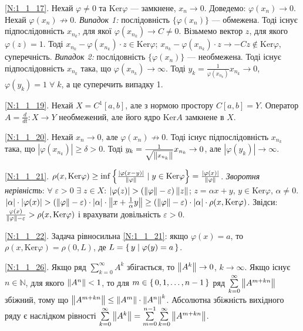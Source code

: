 \noindent\ref{N:1_1_17}. Нехай $\varphi \neq 0$ та $\mathrm{Ker}\varphi$ --- замкнене,
$x_n \to 0$. Доведемо: $\varphi(x_n) \to 0$. Нехай $\varphi(x_n) \not\to 0$.
\textit{Випадок 1:} послідовність $\{\varphi(x_n)\}$ --- обмежена. Тоді існує підпослідовність
$x_{n_k}$, для якої $\varphi(x_{n_k}) \to C \neq 0$. Візьмемо вектор $z$, для якого
$\varphi(z) = 1$. Тоді $x_{n_k} - \varphi(x_{n_k})\cdot z \in \mathrm{Ker}\varphi$;
$x_{n_k} - \varphi(x_{n_k})\cdot z \to - Cz \notin \mathrm{Ker}\varphi$, суперечність.
\textit{Випадок 2:} послідовність $\{\varphi(x_n)\}$ --- необмежена. Тоді існує
підпослідовність $x_{n_k}$ така, що $\varphi(x_{n_k}) \to \infty$. Тоді 
$y_k = \frac{1}{\varphi(x_{n_k})}x_{n_k} \to 0$, $\varphi(y_k)=1 \; \forall \;k$,
а це суперечить випадку 1.

\noindent\ref{N:1_1_19}. Нехай $X = C^1[a,b]$, але з нормою простору $C[a,b]=Y$.
Оператор $A = \frac{d}{dt}: X \to Y$ необмежений, але його ядро $\mathrm{Ker}A$
замкнене в $X$.

\noindent\ref{N:1_1_20}. Нехай $x_n \to 0$, але $\varphi(x_n) \not\to 0$.
Тоді існує підпослідовність $x_{n_k}$ така, що $|\varphi(x_{n_k})| \geq \delta > 0$.
Тоді $y_k = \frac{1}{\sqrt{\left\lVert x_{n_k}\right\rVert}} x_{n_k} \to 0$, але $|\varphi(y_k)|\to\infty$.

\noindent\ref{N:1_1_21}. $\rho(x,\mathrm{Ker}\varphi) \geq \inf
\left\{ \frac{ |\varphi(x-y)| }{ \left\lVert\varphi\right\rVert } \mid y \in \mathrm{Ker}\varphi \right\} = 
\frac{|\varphi(x)|}{\left\lVert\varphi\right\rVert}$.
\textit{Зворотня нерівність}: $\forall\;\varepsilon > 0$ $\exists\; z \in X$:
$|\varphi(z)| > (\left\lVert\varphi\right\rVert - \varepsilon)\left\lVert z\right\rVert$;
$z = \alpha x + y$, $y \in \mathrm{Ker}\varphi$, $\alpha \neq 0$.
$|\alpha| \cdot |\varphi(x)|
> (\left\lVert\varphi\right\rVert - \varepsilon)\cdot|\alpha|\cdot\left\lVert x + \frac{1}{\alpha}y\right\rVert
\geq (\left\lVert\varphi\right\rVert - \varepsilon)\cdot|\alpha|\cdot\rho(x,\mathrm{Ker}\varphi)$.
Звідси: $\frac{\varphi(x)}{\left\lVert\varphi\right\rVert - \varepsilon} > \rho(x,\mathrm{Ker}\varphi)$
і врахувати довільність $\varepsilon > 0$.

\noindent\ref{N:1_1_22}. Задача рівносильна \ref{N:1_1_21}: якщо
$\varphi(x) = a$, то $\rho(x,\mathrm{Ker}\varphi) = \rho(0,L)$, де
$L = \set{y \mid \varphi(y) = a}$.

\noindent\ref{N:1_1_26}. Якщо ряд $\sum\limits^\infty_{k=0} A^k$ збігається,
то $\left\lVert A^k\right\rVert \to 0$, $k \to \infty$. Якщо існує $n \in \mathbb{N}$, для
якого $\left\lVert A^n\right\rVert < 1$, то для $m \in \set{0,1,\dots,n-1}$ ряд
$\sum\limits^\infty_{k=0} \left\lVert A^{m+kn}\right\rVert$ збіжний, тому що $\left\lVert A^{m+kn}\right\rVert
\leq \left\lVert A^m\right\rVert \cdot \left\lVert A^n\right\rVert^k$. Абсолютна збіжність вихідного ряду є
наслідком рівності $\sum\limits^\infty_{k=0} \left\lVert A^k\right\rVert = 
\sum\limits^{n-1}_{m=0} \sum\limits^\infty_{k=0} \left\lVert A^{m+kn}\right\rVert$.

